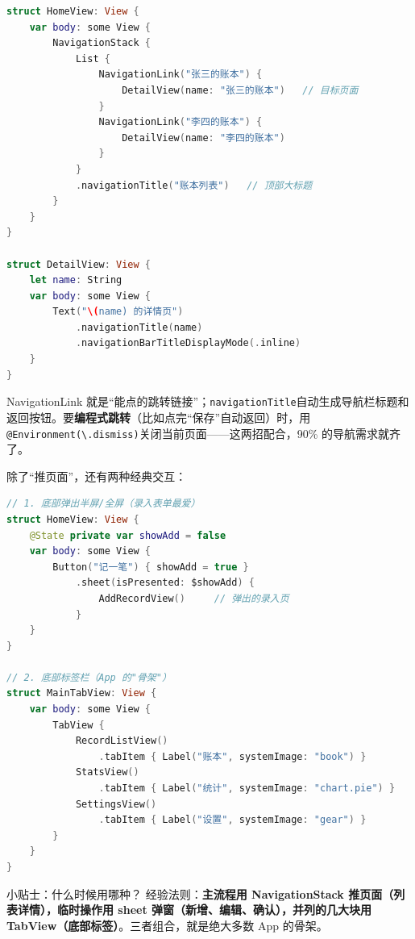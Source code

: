 \begin{lstlisting}[language=Swift]
struct HomeView: View {
    var body: some View {
        NavigationStack {
            List {
                NavigationLink("张三的账本") {
                    DetailView(name: "张三的账本")   // 目标页面
                }
                NavigationLink("李四的账本") {
                    DetailView(name: "李四的账本")
                }
            }
            .navigationTitle("账本列表")   // 顶部大标题
        }
    }
}

struct DetailView: View {
    let name: String
    var body: some View {
        Text("\(name) 的详情页")
            .navigationTitle(name)
            .navigationBarTitleDisplayMode(.inline)
    }
}
\end{lstlisting}

NavigationLink 就是“能点的跳转链接”；\texttt{navigationTitle}自动生成导航栏标题和返回按钮。要\textbf{编程式跳转}（比如点完“保存”自动返回）时，用\texttt{@Environment(\textbackslash{}.\allowbreak dismiss)}关闭当前页面——这两招配合，90\% 的导航需求就齐了。


除了“推页面”，还有两种经典交互：

\begin{lstlisting}[language=Swift]
// 1. 底部弹出半屏/全屏（录入表单最爱）
struct HomeView: View {
    @State private var showAdd = false
    var body: some View {
        Button("记一笔") { showAdd = true }
            .sheet(isPresented: $showAdd) {
                AddRecordView()     // 弹出的录入页
            }
    }
}

// 2. 底部标签栏（App 的"骨架"）
struct MainTabView: View {
    var body: some View {
        TabView {
            RecordListView()
                .tabItem { Label("账本", systemImage: "book") }
            StatsView()
                .tabItem { Label("统计", systemImage: "chart.pie") }
            SettingsView()
                .tabItem { Label("设置", systemImage: "gear") }
        }
    }
}
\end{lstlisting}

\begin{tcbinfo}{小贴士：什么时候用哪种？}
经验法则：\textbf{主流程用 NavigationStack 推页面（列表详情），临时操作用 sheet 弹窗（新增、编辑、确认），并列的几大块用 TabView（底部标签）}。三者组合，就是绝大多数 App 的骨架。

\end{tcbinfo}

